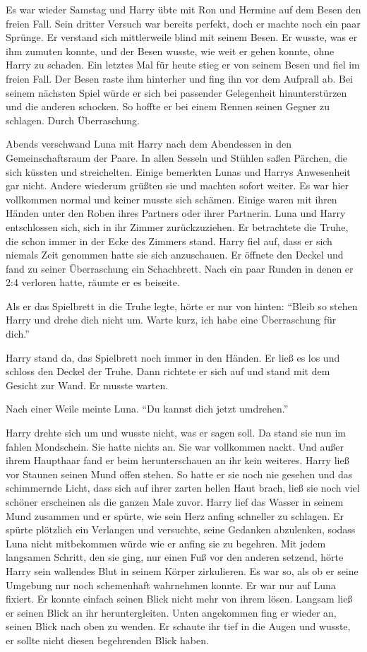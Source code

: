 Es war wieder Samstag und Harry übte mit Ron und Hermine auf dem Besen den freien Fall. Sein dritter Versuch war bereits perfekt, doch er machte noch ein paar Sprünge. Er verstand sich mittlerweile blind mit seinem Besen. Er wusste, was er ihm zumuten konnte, und der Besen wusste, wie weit er gehen konnte, ohne Harry zu schaden. Ein letztes Mal für heute stieg er von seinem Besen und fiel im freien Fall. Der Besen raste ihm hinterher und fing ihn vor dem Aufprall ab. Bei seinem nächsten Spiel würde er sich bei passender Gelegenheit hinunterstürzen und die anderen schocken. So hoffte er bei einem Rennen seinen Gegner zu schlagen. Durch Überraschung.

Abends verschwand Luna mit Harry nach dem Abendessen in den Gemeinschaftsraum der Paare. In allen Sesseln und Stühlen saßen Pärchen, die sich küssten und streichelten. Einige bemerkten Lunas und Harrys Anwesenheit gar nicht. Andere wiederum grüßten sie und machten sofort weiter. Es war hier vollkommen normal und keiner musste sich schämen. Einige waren mit ihren Händen unter den Roben ihres Partners oder ihrer Partnerin. Luna und Harry entschlossen sich, sich in ihr Zimmer zurückzuziehen. Er betrachtete die Truhe, die schon immer in der Ecke des Zimmers stand. Harry fiel auf, dass er sich niemals Zeit genommen hatte sie sich anzuschauen. Er öffnete den Deckel und fand zu seiner Überraschung ein Schachbrett. Nach ein paar Runden in denen er 2:4 verloren hatte, räumte er es beiseite.

Als er das Spielbrett in die Truhe legte, hörte er nur von hinten: \enquote{Bleib so stehen Harry und drehe dich nicht um. Warte kurz, ich habe eine Überraschung für dich.}

Harry stand da, das Spielbrett noch immer in den Händen. Er ließ es los und schloss den Deckel der Truhe. Dann richtete er sich auf und stand mit dem Gesicht zur Wand. Er musste warten.

Nach einer Weile meinte Luna. \enquote{Du kannst dich jetzt umdrehen.}

Harry drehte sich um und wusste nicht, was er sagen soll. Da stand sie nun im fahlen Mondschein. Sie hatte nichts an. Sie war vollkommen nackt. Und außer ihrem Haupthaar fand er beim herunterschauen an ihr kein weiteres. Harry ließ vor Staunen seinen Mund offen stehen. So hatte er sie noch nie gesehen und das schimmernde Licht, dass sich auf ihrer zarten hellen Haut brach, ließ sie noch viel schöner erscheinen als die ganzen Male zuvor. Harry lief das Wasser in seinem Mund zusammen und er spürte, wie sein Herz anfing schneller zu schlagen. Er spürte plötzlich ein Verlangen und versuchte, seine Gedanken abzulenken, sodass Luna nicht mitbekommen würde wie er anfing sie zu begehren. Mit jedem langsamen Schritt, den sie ging, nur einen Fuß vor den anderen setzend, hörte Harry sein wallendes Blut in seinem Körper zirkulieren. Es war so, als ob er seine Umgebung nur noch schemenhaft wahrnehmen konnte. Er war nur auf Luna fixiert. Er konnte einfach seinen Blick nicht mehr von ihrem lösen. Langsam ließ er seinen Blick an ihr heruntergleiten. Unten angekommen fing er wieder an, seinen Blick nach oben zu wenden. Er schaute ihr tief in die Augen und wusste, er sollte nicht diesen begehrenden Blick haben.


